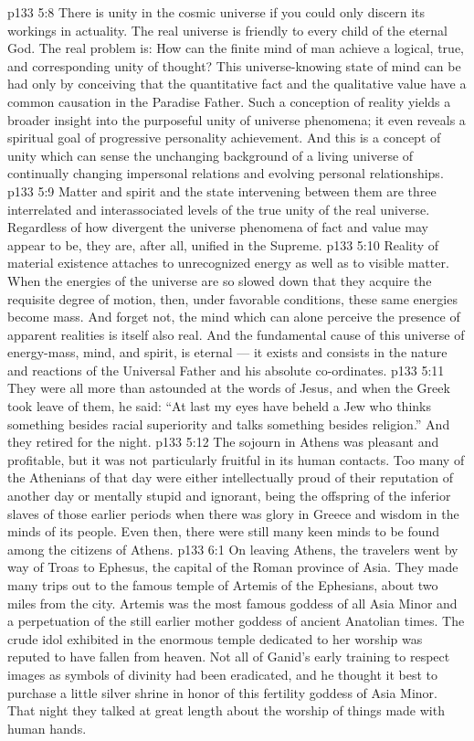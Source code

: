 \vs p133 5:8 There is unity in the cosmic universe if you could only discern its workings in actuality. The real universe is friendly to every child of the eternal God. The real problem is: How can the finite mind of man achieve a logical, true, and corresponding unity of thought? This universe\hyp{}knowing state of mind can be had only by conceiving that the quantitative fact and the qualitative value have a common causation in the Paradise Father. Such a conception of reality yields a broader insight into the purposeful unity of universe phenomena; it even reveals a spiritual goal of progressive personality achievement. And this is a concept of unity which can sense the unchanging background of a living universe of continually changing impersonal relations and evolving personal relationships.
\vs p133 5:9 Matter and spirit and the state intervening between them are three interrelated and interassociated levels of the true unity of the real universe. Regardless of how divergent the universe phenomena of fact and value may appear to be, they are, after all, unified in the Supreme.
\vs p133 5:10 Reality of material existence attaches to unrecognized energy as well as to visible matter. When the energies of the universe are so slowed down that they acquire the requisite degree of motion, then, under favorable conditions, these same energies become mass. And forget not, the mind which can alone perceive the presence of apparent realities is itself also real. And the fundamental cause of this universe of energy\hyp{}mass, mind, and spirit, is eternal --- it exists and consists in the nature and reactions of the Universal Father and his absolute co\hyp{}ordinates.
\vs p133 5:11 \pc They were all more than astounded at the words of Jesus, and when the Greek took leave of them, he said: “At last my eyes have beheld a Jew who thinks something besides racial superiority and talks something besides religion.” And they retired for the night.
\vs p133 5:12 The sojourn in Athens was pleasant and profitable, but it was not particularly fruitful in its human contacts. Too many of the Athenians of that day were either intellectually proud of their reputation of another day or mentally stupid and ignorant, being the offspring of the inferior slaves of those earlier periods when there was glory in Greece and wisdom in the minds of its people. Even then, there were still many keen minds to be found among the citizens of Athens.
\vs p133 6:1 On leaving Athens, the travelers went by way of Troas to Ephesus, the capital of the Roman province of Asia. They made many trips out to the famous temple of Artemis of the Ephesians, about two miles from the city. Artemis was the most famous goddess of all Asia Minor and a perpetuation of the still earlier mother goddess of ancient Anatolian times. The crude idol exhibited in the enormous temple dedicated to her worship was reputed to have fallen from heaven. Not all of Ganid’s early training to respect images as symbols of divinity had been eradicated, and he thought it best to purchase a little silver shrine in honor of this fertility goddess of Asia Minor. That night they talked at great length about the worship of things made with human hands.
